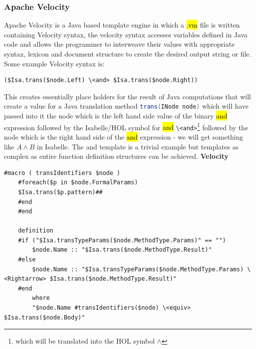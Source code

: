 	\subsubsection{Apache Velocity} \label{av}
	Apache Velocity is a Java based template engine in which a \ttfamily\hl{.vm} \rmfamily file is written containing Velocity syntax, the velocity syntax accesses variables defined in Java code and allows the programmer to interweave their values with appropriate syntax, lexicon and document structure to create the desired output string or file. Some example Velocity syntax is:
	\hfill\break
	\begin{lstlisting}[language=Velocity]
		($Isa.trans($node.Left) \<and> $Isa.trans($node.Right))
	\end{lstlisting} 
	\hfill\break
	This creates essentially place holders for the result of Java computations that will create a value for a Java translation method \lstinline[language=Java]{trans(INode node)} which will have passed into it the node which is the left hand side value of the binary \ttfamily\hl{and} \rmfamily expression followed by the Isabelle/HOL symbol for \ttfamily\hl{and} \rmfamily \lstinline[language=Isabelle, mathescape]{\<and>}\footnote{which will be translated into the HOL symbol $\wedge$} followed by the node which is the right hand side of the \ttfamily\hl{and} \rmfamily expression - we will get something like $A \wedge B$ in Isabelle. The and template is a trivial example but templates as complex as entire function definition structures can be achieved.  
	\hfill\break
	\hfill\break
	\hfill\break
	\hfill\break
	\textbf{Velocity}
	\begin{lstlisting}[language=Velocity, caption=The Velocity template for function declarations. Below is a translation showing how one such template is used in practice.]
	#macro ( transIdentifiers $node )
	#foreach($p in $node.FormalParams)
	$Isa.trans($p.pattern)##
	#end
	#end

	definition
	#if ("$Isa.transTypeParams($node.MethodType.Params)" == "")
		$node.Name :: "$Isa.trans($node.MethodType.Result)"
	#else
		$node.Name :: "$Isa.transTypeParams($node.MethodType.Params) \<Rightarrow> $Isa.trans($node.MethodType.Result)"
	#end
	    where
	    "$node.Name #transIdentifiers($node) \<equiv> $Isa.trans($node.Body)"
	\end{lstlisting} 

